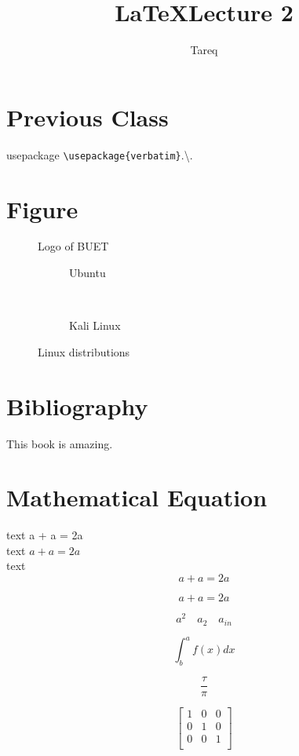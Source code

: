 \documentclass{article}
\title{\LaTeX Lecture 2}
\author{Tareq}
\begin{document}
\maketitle

\section{Previous Class}

usepackage \verb|\usepackage{verbatim}|.\textbackslash.

\section{Figure}

\begin{figure}[h]
	\centering
	\caption{Logo of BUET}
	\label{fig:buetlogo}
\end{figure}


\begin{figure}[h]
	\centering
	\begin{subfigure}{0.4\textwidth}
		\caption{Ubuntu}
	\end{subfigure}
	~
	\begin{subfigure}{0.4\textwidth}
		\caption{Kali Linux}
	\end{subfigure}

	\caption{Linux distributions}
\end{figure}


\section{Bibliography}

This book \cite{deng2009imagenet} is amazing. 


\section{Mathematical Equation}

text a + a = 2a\\
text $ a + a = 2a $\\

text $$ a + a = 2a $$

\begin{equation}
a + a = 2a
\end{equation}

$$ a^2 \quad a_2 \quad a_{in} $$

$$ \int^a_b f(x)dx $$

$$ \frac{\tau}{\pi} $$

\begin{equation}
\begin{bmatrix}
1 & 0 & 0\\
0 & 1 & 0\\
0 & 0 & 1\\
\end{bmatrix}
\end{equation}




\end{document}
